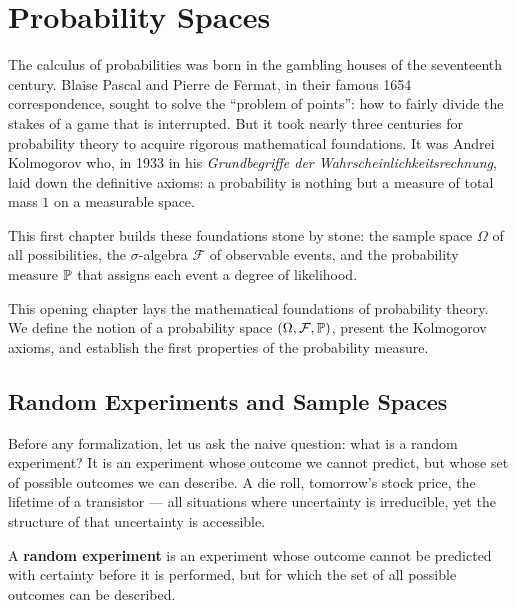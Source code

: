 \chapter{Probability Spaces}
\label{ch:spaces}

The calculus of probabilities was born in the gambling houses of the
seventeenth century. Blaise Pascal and Pierre de Fermat, in their famous
1654 correspondence, sought to solve the ``problem of points'': how to
fairly divide the stakes of a game that is interrupted. But it took nearly
three centuries for probability theory to acquire rigorous mathematical
foundations. It was Andrei Kolmogorov who, in 1933 in his
\emph{Grundbegriffe der Wahrscheinlichkeitsrechnung}, laid down the
definitive axioms: a probability is nothing but a measure of total mass $1$
on a measurable space.

This first chapter builds these foundations stone by stone: the sample space
$\Omega$ of all possibilities, the $\sigma$-algebra $\mathcal{F}$ of
observable events, and the probability measure $\mathbb{P}$ that assigns each event
a degree of likelihood.

\begin{intuition}
This opening chapter lays the mathematical foundations of probability theory.
We define the notion of a probability space $(\Omega, \mathcal{F}, \mathbb{P})$,
present the Kolmogorov axioms, and establish the first properties of the
probability measure.
\end{intuition}

\section{Random Experiments and Sample Spaces}

Before any formalization, let us ask the naive question: what is a random
experiment? It is an experiment whose outcome we cannot predict, but whose
set of possible outcomes we can describe. A die roll, tomorrow's stock
price, the lifetime of a transistor --- all situations where uncertainty is
irreducible, yet the structure of that uncertainty is accessible.

\begin{definition}
A \textbf{random experiment} is an experiment whose outcome cannot be predicted
with certainty before it is performed, but for which the set of all possible
outcomes can be described.
\end{definition}

